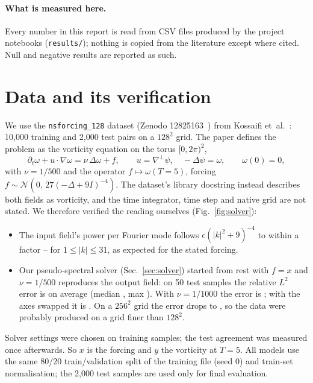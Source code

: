 \documentclass[11pt,a4paper]{article}
\begin{document}
\paragraph{What is measured here.} Every number in this report is read from CSV files produced by the project
notebooks (\texttt{results/}); nothing is copied from the literature except where cited. Null and negative results
are reported as such.

\section{Data and its verification}
We use the \texttt{nsforcing\_128} dataset (Zenodo 12825163~\cite{zenodo}) from Kossaifi et~al.~\cite{mgtfno}:
10{,}000 training and 2{,}000 test pairs on a $128^2$ grid. The paper defines the problem as the vorticity equation
on the torus $[0,2\pi)^2$,
\begin{equation}
\partial_t \omega + u\cdot\nabla\omega = \nu\,\Delta\omega + f,\qquad u=\nabla^\perp\psi,\quad -\Delta\psi=\omega,
\qquad \omega(0)=0,
\end{equation}
with $\nu=1/500$ and the operator $f\mapsto\omega(T{=}5)$, forcing $f\sim\mathcal N(0,\,27(-\Delta+9I)^{-4})$. The
dataset's library docstring instead describes both fields as vorticity, and the time integrator, time step and native
grid are not stated. We therefore verified the reading ourselves (Fig.~\ref{fig:solver}):
\begin{itemize}\itemsep1pt
\item The input field's power per Fourier mode follows $c(|k|^2+9)^{-4}$ to within a factor \SpecLo--\SpecHi{} for
$1\le|k|\le 31$, as expected for the stated forcing.
\item Our pseudo-spectral solver (Sec.~\ref{sec:solver}) started from rest with $f=x$ and $\nu=1/500$ reproduces the
output field: on 50 test samples the relative $L^2$ error is \SolverMean{} on average (median \SolverMedian, max
\SolverMax). With $\nu=1/1000$ the error is \NuThousand; with the axes swapped it is \WrongSign.
On a $256^2$ grid the error drops to , so the data were probably produced on a grid finer than $128^2$.
\end{itemize}
Solver settings were chosen on training samples; the test agreement was measured once afterwards.
So $x$ is the forcing and $y$ the vorticity at $T=5$. All models use the same 80/20 train/validation split
of the training file (seed 0) and train-set normalisation; the 2{,}000 test samples are used only for final
evaluation.
\end{document}
